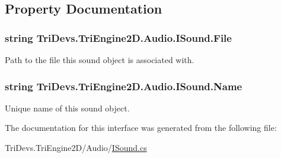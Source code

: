 \subsection{Property Documentation}
\hypertarget{interface_tri_devs_1_1_tri_engine2_d_1_1_audio_1_1_i_sound_af308fcad8f9f11a39af7a3d253039cae}{
\subsubsection[{File}]{\setlength{\rightskip}{0pt plus 5cm}string Tri\-Devs.\-Tri\-Engine2\-D.\-Audio.\-I\-Sound.\-File\hspace{0.3cm}{\ttfamily [get]}}}\label{interface_tri_devs_1_1_tri_engine2_d_1_1_audio_1_1_i_sound_af308fcad8f9f11a39af7a3d253039cae}


Path to the file this sound object is associated with. 

\hypertarget{interface_tri_devs_1_1_tri_engine2_d_1_1_audio_1_1_i_sound_a2307573aedd92969cf3d051b395c5bc0}{
\subsubsection[{Name}]{\setlength{\rightskip}{0pt plus 5cm}string Tri\-Devs.\-Tri\-Engine2\-D.\-Audio.\-I\-Sound.\-Name\hspace{0.3cm}{\ttfamily [get]}}}\label{interface_tri_devs_1_1_tri_engine2_d_1_1_audio_1_1_i_sound_a2307573aedd92969cf3d051b395c5bc0}


Unique name of this sound object. 



The documentation for this interface was generated from the following file\-:\begin{DoxyCompactItemize}
\item 
Tri\-Devs.\-Tri\-Engine2\-D/\-Audio/\hyperlink{_i_sound_8cs}{I\-Sound.\-cs}\end{DoxyCompactItemize}
